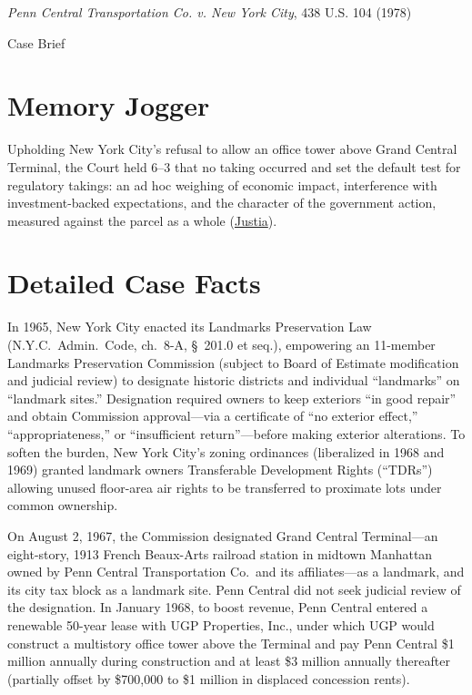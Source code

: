 \documentclass[12pt]{article}
\begin{document}
\begin{center}
{\LARGE \textit{Penn Central Transportation Co. v. New York City}, 438 U.S. 104 (1978)\par}
\vspace{0.8em}
{\large Case Brief\par}
\end{center}
\vspace{1em}

\section{Memory Jogger}
Upholding New York City's refusal to allow an office tower above Grand Central Terminal, the Court held 6--3 that no taking occurred and set the default test for regulatory takings: an ad hoc weighing of economic impact, interference with investment-backed expectations, and the character of the government action, measured against the parcel as a whole (\href{https://supreme.justia.com/cases/federal/us/438/104/}{Justia}).

\section{Detailed Case Facts}
In 1965, New York City enacted its Landmarks Preservation Law (N.Y.C.\ Admin.\ Code, ch.\ 8-A, \S\ 201.0 et seq.), empowering an 11-member Landmarks Preservation Commission (subject to Board of Estimate modification and judicial review) to designate historic districts and individual ``landmarks'' on ``landmark sites.'' Designation required owners to keep exteriors ``in good repair'' and obtain Commission approval---via a certificate of ``no exterior effect,'' ``appropriateness,'' or ``insufficient return''---before making exterior alterations. To soften the burden, New York City's zoning ordinances (liberalized in 1968 and 1969) granted landmark owners Transferable Development Rights (``TDRs'') allowing unused floor-area air rights to be transferred to proximate lots under common ownership.

On August 2, 1967, the Commission designated Grand Central Terminal---an eight-story, 1913 French Beaux-Arts railroad station in midtown Manhattan owned by Penn Central Transportation Co.\ and its affiliates---as a landmark, and its city tax block as a landmark site. Penn Central did not seek judicial review of the designation. In January 1968, to boost revenue, Penn Central entered a renewable 50-year lease with UGP Properties, Inc., under which UGP would construct a multistory office tower above the Terminal and pay Penn Central \$1 million annually during construction and at least \$3 million annually thereafter (partially offset by \$700,000 to \$1 million in displaced concession rents).
\end{document}
